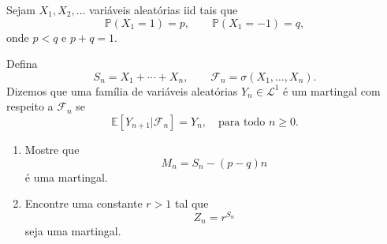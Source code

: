 \documentclass{article}
\newcommand*\1{\mathds{1}}
\begin{document}
\vspace{4mm}
 Sejam $X_1,X_2,\dots$ variáveis aleatórias iid tais que
\begin{equation}
\mathbb P(X_1=1)=p,
\qquad
\mathbb P(X_1=-1)=q,
\end{equation}
onde $p<q$ e $p+q=1$.

Defina
\begin{equation}
S_n=X_1+\cdots+X_n,
\qquad
\mathcal F_n=\sigma(X_1,\dots,X_n).
\end{equation}
Dizemos que uma família de variáveis aleatórias $Y_n \in \mathcal{L}^1$ é um martingal com respeito a $\mathcal{F}_n$ se
\begin{equation}
  \mathbb{E}[Y_{n + 1} | \mathcal{F}_n] = Y_n, \quad \text{para todo $n \geq 0$}.
\end{equation}

\begin{enumerate}
    \item Mostre que
    \begin{equation}
    M_n=S_n-(p-q)n
    \end{equation}
    é uma martingal.

    \item Encontre uma constante $r>1$ tal que
    \begin{equation}
    Z_n=r^{S_n}
    \end{equation}
    seja uma martingal.
\end{enumerate}
\end{document}
